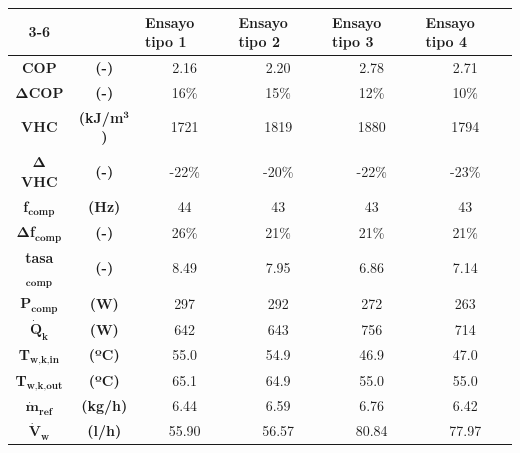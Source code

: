 
\begin{tabular}{cc|c|c|c|c|}
\cline{3-6}
\multicolumn{1}{l}{} & \multicolumn{1}{l|}{} & \multicolumn{1}{l|}{\textbf{Ensayo tipo 1}} & \multicolumn{1}{l|}{\textbf{Ensayo tipo 2}} & \multicolumn{1}{l|}{\textbf{Ensayo tipo 3}} & \multicolumn{1}{l|}{\textbf{Ensayo tipo 4}} \\ \hline
\multicolumn{1}{|c}{\textbf{COP}} & \textbf{(-)} & 2.16 & 2.20 & 2.78 & 2.71 \\ \hline
\multicolumn{1}{|c}{$\bm{\Delta}$\textbf{COP}} & \textbf{(-)} & 16\% & 15\% & 12\% & 10\% \\ \hline
\multicolumn{1}{|c}{\textbf{VHC}} & \textbf{(kJ/m$^\textbf{3}$)} & 1721 & 1819 & 1880 & 1794 \\ \hline
\multicolumn{1}{|c}{$\bm{\Delta}$\textbf{VHC}} & \textbf{(-)} & -22\% & -20\% & -22\% & -23\% \\ \hline
\multicolumn{1}{|c}{\textbf{f}$_\textbf{comp}$} & \textbf{(Hz)} & 44 & 43 & 43 & 43 \\ \hline
\multicolumn{1}{|c}{$\bm{\Delta}$\textbf{f}$_\textbf{comp}$} & \textbf{(-)} & 26\% & 21\% & 21\% & 21\% \\ \hline
\multicolumn{1}{|c}{\textbf{tasa}$_\textbf{comp}$} & \textbf{(-)} & 8.49 & 7.95 & 6.86 & 7.14 \\ \hline
\multicolumn{1}{|c}{\textbf{P}$_\textbf{comp}$} & \textbf{(W)} & 297 & 292 & 272 & 263 \\ \hline
\multicolumn{1}{|c}{$\dot{\textbf{Q}}_\textbf{k}$} & \textbf{(W)} & 642 & 643 & 756 & 714 \\ \hline
\multicolumn{1}{|c}{\textbf{T}$_\textbf{w,k,in}$} & \textbf{(ºC)} & 55.0 & 54.9 & 46.9 & 47.0 \\ \hline
\multicolumn{1}{|c}{\textbf{T}$_\textbf{w,k,out}$} & \textbf{(ºC)} & 65.1 & 64.9 & 55.0 & 55.0 \\ \hline
\multicolumn{1}{|c}{$\dot{\textbf{m}}_\textbf{ref}$} & \textbf{(kg/h)} & 6.44 & 6.59 & 6.76 & 6.42 \\ \hline
\multicolumn{1}{|c}{$\dot{\textbf{V}}_\textbf{w}$} & \textbf{(l/h)} & 55.90 & 56.57 & 80.84 & 77.97 \\ \hline
\end{tabular}
